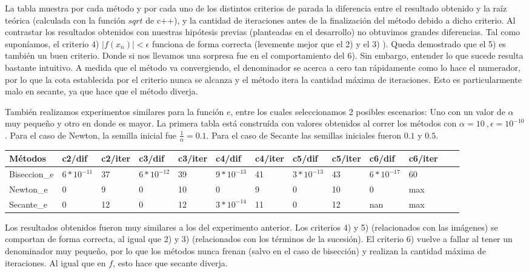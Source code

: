La tabla muestra por cada método y por cada uno de los distintos criterios de parada
la diferencia entre el resultado obtenido y la raíz teórica (calculada con la función $sqrt$ de c++), y la cantidad de iteraciones antes de la finalización del método debido a dicho criterio.
Al contrastar los resultados obtenidos con nuestras hipótesis previas (planteadas en el desarrollo) no obtuvimos grandes diferencias. Tal como suponíamos, el criterio 4) $|f(x_{n})| < \epsilon$ funciona
de forma correcta (levemente mejor que el 2) y el 3) ). Queda demostrado que el 5) es también un buen criterio. Donde si nos llevamos una sorpresa fue en el comportamiento del 6). Sin embargo, entender lo
que sucede resulta bastante intuitivo. A medida que el método va convergiendo, el denominador se acerca a cero tan rápidamente como lo hace el numerador, por lo que la cota establecida por el criterio
nunca se alcanza y el método itera la cantidad máxima de iteraciones. Esto es particularmente malo en secante, ya que hace que el método diverja.

También realizamos experimentos similares para la función $e$, entre los cuales seleccionamos 2 posibles escenarios: Uno con un valor de $\alpha$ muy peque\~no y otro en donde es mayor. La primera tabla
está construída con valores obtenidos al correr los métodos con $\alpha=10 \ , \epsilon = 10^{-10}$. Para el caso de Newton, la semilla inicial fue $\frac{1}{\alpha} = 0.1$.
Para el caso de Secante las semillas iniciales fueron $0.1$ y $0.5$.
\begin{center}
    \small{
    \begin{tabular}{| l | l | l | l | l | l | l | l | l | l | l | l | l |}
    \hline
    Métodos & c2/dif & c2/iter & c3/dif & c3/iter & c4/dif & c4/iter & c5/dif & c5/iter & c6/dif & c6/iter \\ \hline
    Biseccion\_e & $6*10^{-11}$ & 37 & $6*10^{-12}$ & 39 & $9*10^{-13}$ & 41 & $3*10^{-13}$ & 43 & $6*10^{-17}$ & 60 \\ \hline
    Newton\_e & 0 & 9 & 0 & 10 & 0 & 9 & 0 & 10 & 0 & max \\ \hline
    Secante\_e & 0 & 12 & 0 & 12 & $3*10^{-14}$ & 11 & 0 & 12 & nan & max \\ \hline
    \end{tabular}
    }
\end{center}

Los resultados obtenidos fueron muy similares a los del experimento anterior. Los criterios 4) y 5) (relacionados con las imágenes) se comportan de forma correcta, al igual que 2) y 3) (relacionados con los
términos de la sucesión). El criterio 6) vuelve a fallar al tener un denominador muy peque\~no, por lo que los métodos nunca frenan (salvo en el caso de bisección)
y realizan la cantidad máxima de iteraciones. Al igual que en $f$, esto hace que secante diverja.

